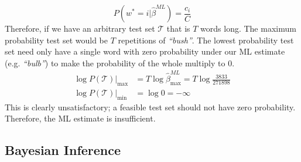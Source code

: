 \documentclass[]{article}
\newcommand{\betaml}{\hat{\beta}^{ML}}
\begin{document}
%
\begin{equation}
	P(w^* = i | \betaml) = \frac{c_i}{C}
	\label{eqn:ml-est}
\end{equation}
%
Therefore, if we have an arbitrary test set $\mathcal{T}$ that is $T$ words long. The maximum probability test set would be $T$ repetitions of \textit{``bush''}. The lowest probability test set need only have a single word with zero probability under our ML estimate (e.g. \textit{``bulb''}) to make the probability of the whole multiply to 0.
%
\begin{align}
	\log P(\mathcal{T}) |_{\max} &= T \log \betaml_{\max} = T \log \frac{3833}{271898} \\
	\log P(\mathcal{T}) |_{\min} &= \log 0 = - \infty
\end{align}
%
This is clearly unsatisfactory; a feasible test set should not have zero probability. Therefore, the ML estimate is insufficient.
 
\subsection{Bayesian Inference}
\end{document}
